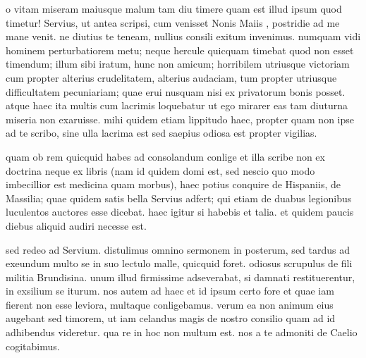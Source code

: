 


 o vitam miseram maiusque malum tam diu timere quam est illud ipsum quod timetur! Servius, ut antea scripsi, cum venisset Nonis Maiis , postridie ad me mane venit. ne diutius te teneam, nullius consili exitum invenimus. numquam vidi hominem perturbatiorem metu; neque hercule quicquam timebat quod non esset timendum; illum sibi iratum, hunc non amicum; horribilem utriusque victoriam cum propter alterius crudelitatem, alterius audaciam, tum propter utriusque difficultatem pecuniariam; quae erui nusquam nisi ex privatorum bonis posset. atque haec ita multis cum lacrimis loquebatur ut ego mirarer eas tam diuturna miseria non exaruisse. mihi quidem etiam lippitudo haec, propter quam non ipse ad te scribo, sine ulla lacrima est sed saepius odiosa est propter vigilias.

 quam ob rem quicquid habes ad consolandum conlige et illa scribe non ex doctrina neque ex libris (nam id quidem domi est, sed nescio quo modo imbecillior est medicina quam morbus), haec potius conquire de Hispaniis, de Massilia; quae quidem satis bella Servius adfert; qui etiam de duabus legionibus luculentos auctores esse dicebat. haec igitur si habebis et talia. et quidem paucis diebus aliquid audiri necesse est.

 sed redeo ad Servium. distulimus omnino sermonem in posterum, sed tardus ad exeundum multo se in suo lectulo malle, quicquid foret. odiosus scrupulus de fili militia Brundisina. unum illud firmissime adseverabat, si damnati restituerentur, in exsilium se iturum. nos autem ad haec et id ipsum certo fore et quae iam fierent non esse leviora, multaque conligebamus. verum ea non animum eius augebant sed timorem, ut iam celandus magis de nostro consilio quam ad id adhibendus videretur. qua re in hoc non multum est. nos a te admoniti de Caelio cogitabimus.
